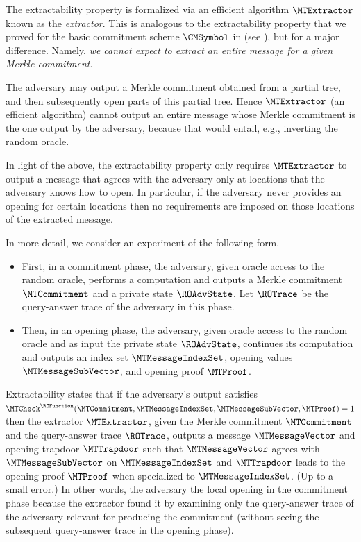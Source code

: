The extractability property is formalized via an efficient algorithm $\MTExtractor$ known as the \emph{extractor}. This is analogous to the extractability property that we proved for the basic commitment scheme $\CMSymbol$ in  (see ), but for a major difference. Namely, \emph{we cannot expect to extract an entire message for a given Merkle commitment}.

The adversary may output a Merkle commitment obtained from a partial tree, and then subsequently open parts of this partial tree. Hence $\MTExtractor$ (an efficient algorithm) cannot output an entire message whose Merkle commitment is the one output by the adversary, because that would entail, e.g., inverting the random oracle.

In light of the above, the extractability property only requires $\MTExtractor$ to output a message that agrees with the adversary only at locations that the adversary knows how to open. In particular, if the adversary never provides an opening for certain locations then no requirements are imposed on those locations of the extracted message.

In more detail, we consider an experiment of the following form.
\begin{itemize}

  \item First, in a commitment phase, the adversary, given oracle access to the random oracle, performs a computation and outputs a Merkle commitment $\MTCommitment$ and a private state $\ROAdvState$. Let $\ROTrace$ be the query-answer trace of the adversary in this phase.

  \item Then, in an opening phase, the adversary, given oracle access to the random oracle and as input the private state $\ROAdvState$, continues its computation and outputs an index set $\MTMessageIndexSet$, opening values $\MTMessageSubVector$, and opening proof $\MTProof$.

\end{itemize}
Extractability states that if the adversary's output satisfies $\MTCheck^{\ROFunction}(\MTCommitment,\MTMessageIndexSet,\MTMessageSubVector,\MTProof)=1$ then the extractor $\MTExtractor$, given the Merkle commitment $\MTCommitment$ and the query-answer trace $\ROTrace$, outputs a message $\MTMessageVector$ and opening trapdoor $\MTTrapdoor$ such that $\MTMessageVector$ agrees with $\MTMessageSubVector$ on $\MTMessageIndexSet$ and $\MTTrapdoor$ leads to the opening proof $\MTProof$ when specialized to $\MTMessageIndexSet$. (Up to a small error.) In other words, the adversary  the local opening in the commitment phase because the extractor found it by examining only the query-answer trace of the adversary relevant for producing the commitment (without seeing the subsequent query-answer trace in the opening phase).

